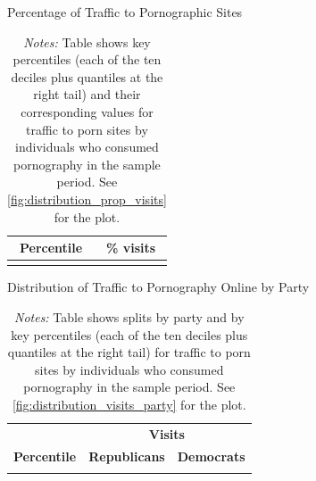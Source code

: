\documentclass[12pt, letterpaper]{article}
\begin{document}
\begin{table} \centering \small \setlength\tabcolsep{10 pt}
	\caption{Percentage of Traffic to Pornographic Sites}
	\label{tab:distribution_prop_visits}
	\begin{adjustbox}{max width=\textwidth}
		\begin{tabular}{cr}
			\toprule
			\multicolumn{1}{c}{\textbf{Percentile}}&\multicolumn{1}{c}{\textbf{\% visits}}\\
			\midrule
			\\
			\bottomrule
		\end{tabular}
	\end{adjustbox}
	\caption*{\footnotesize \emph{Notes:} 
		Table shows key percentiles (each of the ten deciles plus quantiles at the right tail) and their corresponding values for traffic to porn sites by individuals who consumed pornography in the sample period. 
		See \cref{fig:distribution_prop_visits} for the plot.
	}
\end{table}


\begin{table} \centering \small \setlength\tabcolsep{10 pt}
	\caption{Distribution of Traffic to Pornography Online by Party}
	\label{tab:distribution_visits_party}
	\begin{adjustbox}{max width=\textwidth}
		\begin{tabular}{crr}
			\toprule
			\multicolumn{1}{l}{\textbf{}}&\multicolumn{2}{c}{\textbf{Visits}}\\
			\cmidrule(l){2-3}
			\multicolumn{1}{l}{\textbf{Percentile}}&\multicolumn{1}{c}{\textbf{Republicans}}&\multicolumn{1}{c}{\textbf{Democrats}}\\			
			\midrule
			\\
			\bottomrule
		\end{tabular}
	\end{adjustbox}
	\caption*{\footnotesize \emph{Notes:} 
		Table shows splits by party and by key percentiles (each of the ten deciles plus quantiles at the right tail) for traffic to porn sites by individuals who consumed pornography in the sample period. See \cref{fig:distribution_visits_party} for the plot.
	}
\end{table}
\end{document}
